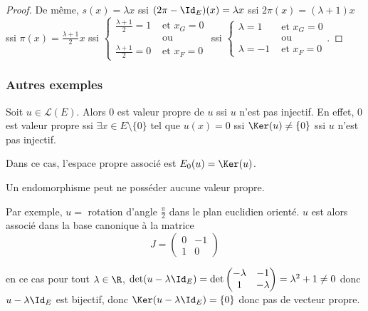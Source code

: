 \begin{exemple}
\begin{proof}
        \avspace De même, $s(x) = \lambda x$ ssi $(2 \pi - \Id_E)(x) = \lambda x$ ssi
        $2 \pi(x) = (\lambda + 1) x$ ssi $\pi(x) = \frac{\lambda + 1}{2} x$ 
        ssi $\begin{cases}
            \frac{\lambda + 1}{2} = 1 &\text{ et } x_G = 0 \\
            & \text{ ou } \\
            \frac{\lambda + 1}{2} = 0 &\text{ et } x_F = 0
        \end{cases}$ ssi $\begin{cases}
            \lambda = 1 &\text{ et } x_G = 0 \\
            & \text{ ou } \\
            \lambda = -1 &\text{ et } x_F = 0
        \end{cases}$.
    \end{proof}
\end{exemple}

\subsubsection{Autres exemples }


\avspace

\begin{exemple}
    Soit $u \in \mathscr L(E)$. Alors $0$ est valeur propre de $u$ ssi $u$ n'est pas injectif.
    En effet, $0$ est valeur propre ssi $\exists x \in E \setminus \{0\}$ tel que $u(x) = 0$ 
    ssi $\Ker(u) \neq \{0\}$ ssi $u$ n'est pas injectif.

    Dans ce cas, l'espace propre associé est $E_0(u) = \Ker(u)$.
\end{exemple}

Un endomorphisme peut ne posséder aucune valeur propre.

\begin{exemple}
    Par exemple, $u = $ rotation d'angle $\frac \pi 2$ dans le plan euclidien orienté. 
    $u$ est alors associé dans la base canonique à la matrice
    \[
        J = \begin{pmatrix}
            0 & -1 \\
            1 & 0
        \end{pmatrix}
    \]

    en ce cas pour tout $\lambda \in \R$, $\det(u - \lambda \Id_E) = \det \begin{pmatrix}
        -\lambda & -1 \\
        1 & -\lambda
    \end{pmatrix} = \lambda^2 + 1 \neq 0$ donc $u - \lambda \Id_E$ est bijectif, donc 
    $\Ker(u - \lambda \Id_E) = \{0\}$ donc pas de vecteur propre. 
\end{exemple}

